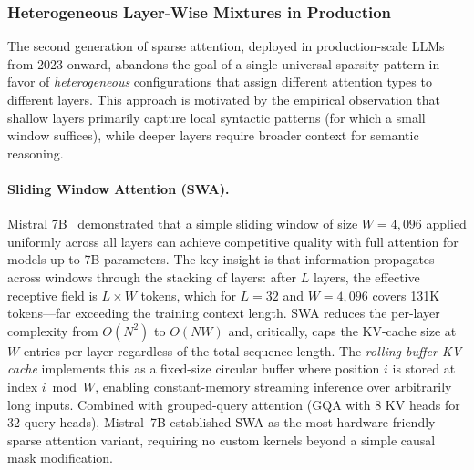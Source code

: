 \subsubsection{Heterogeneous Layer-Wise Mixtures in Production}
\label{subsubsec:heterogeneous-sparse}

The second generation of sparse attention, deployed in production-scale LLMs from 2023 onward, abandons the goal of a single universal sparsity pattern in favor of \emph{heterogeneous} configurations that assign different attention types to different layers. This approach is motivated by the empirical observation that shallow layers primarily capture local syntactic patterns (for which a small window suffices), while deeper layers require broader context for semantic reasoning.

\paragraph{Sliding Window Attention (SWA).}
Mistral 7B~\cite{jiang2023mistral} demonstrated that a simple sliding window of size $W = 4{,}096$ applied uniformly across all layers can achieve competitive quality with full attention for models up to 7B parameters. The key insight is that information propagates across windows through the stacking of layers: after $L$ layers, the effective receptive field is $L \times W$ tokens, which for $L = 32$ and $W = 4{,}096$ covers 131K tokens---far exceeding the training context length. SWA reduces the per-layer complexity from $O(N^2)$ to $O(NW)$ and, critically, caps the KV-cache size at $W$ entries per layer regardless of the total sequence length. The \emph{rolling buffer KV cache} implements this as a fixed-size circular buffer where position $i$ is stored at index $i \bmod W$, enabling constant-memory streaming inference over arbitrarily long inputs. Combined with grouped-query attention (GQA with 8 KV heads for 32 query heads), Mistral~7B established SWA as the most hardware-friendly sparse attention variant, requiring no custom kernels beyond a simple causal mask modification.


